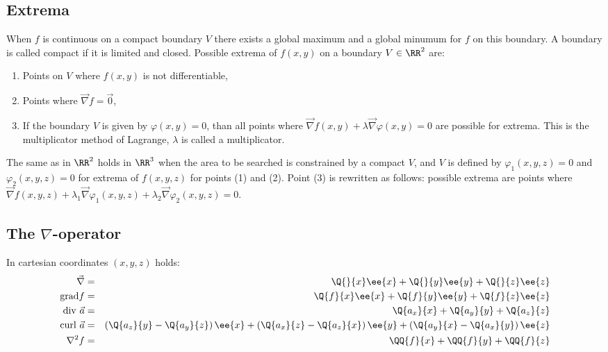 \subsection{Extrema}
When $f$ is continuous on a compact boundary $V$ there exists a global
maximum and a global minumum for $f$ on this boundary. A boundary is called
compact if it is limited and closed.
\npar
Possible extrema of $f(x,y)$ on a boundary $V\in\RR^2$ are:
\begin{enumerate}
\item Points on $V$ where $f(x,y)$ is not differentiable,
\item Points where $\vec{\nabla}f=\vec{0}$,
\item If the boundary $V$ is given by $\varphi(x,y)=0$, than all points where
      $\vec{\nabla}f(x,y)+\lambda\vec{\nabla}\varphi(x,y)=0$ are possible
      for extrema. This is the multiplicator method of Lagrange, $\lambda$
      is called a multiplicator.
\end{enumerate}
The same as in $\RR^2$ holds in $\RR^3$ when the area to be searched is
constrained by a compact $V$, and $V$ is defined by $\varphi_1(x,y,z)=0$ and
$\varphi_2(x,y,z)=0$ for extrema of $f(x,y,z)$ for points (1) and (2).
Point (3) is rewritten as follows: possible extrema are points where
$\vec{\nabla}f(x,y,z)+\lambda_1\vec{\nabla}\varphi_1(x,y,z)+\lambda_2\vec{\nabla}\varphi_2(x,y,z)=0$.

\subsection{The $\nabla$-operator}
In cartesian coordinates $(x,y,z)$ holds:
\begin{eqnarray*}
\vec{\nabla}     &=&\Q{}{x}\ee{x}+\Q{}{y}\ee{y}+\Q{}{z}\ee{z}\\
{\rm grad}f      &=&\Q{f}{x}\ee{x}+\Q{f}{y}\ee{y}+\Q{f}{z}\ee{z}\\
{\rm div}~\vec{a}&=&\Q{a_x}{x}+\Q{a_y}{y}+\Q{a_z}{z}\\
{\rm curl}~\vec{a}&=&\left(\Q{a_z}{y}-\Q{a_y}{z}\right)\ee{x}+
                    \left(\Q{a_x}{z}-\Q{a_z}{x}\right)\ee{y}+
                    \left(\Q{a_y}{x}-\Q{a_x}{y}\right)\ee{z}\\
\nabla^2 f       &=&\QQ{f}{x}+\QQ{f}{y}+\QQ{f}{z}
\end{eqnarray*}

